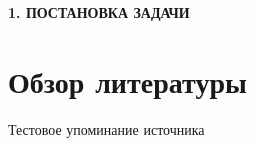 \newpage
\begin{center}
	\textbf{\large 1. ПОСТАНОВКА ЗАДАЧИ}
\end{center}

\section{Обзор литературы}

Тестовое упоминание источника \cite{666.666}
